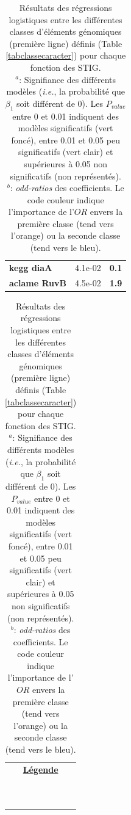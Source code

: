 \begin{landscape}
\begin{table}
{\begin{minipage}[t]{0.3\textwidth}
\begin{tabular}{>{\bfseries}p{\textwidth}cc}
\rowcolor{posit2}kegg diaA&4.1e-02&\textbf{\colorbox{colorpowernegxx}{0.1}}\\
\rowcolor{posit2}aclame RuvB&4.5e-02&\textbf{\colorbox{colorpower}{1.9}}\\
	\end{tabular}
	\begin{tabular}{@{\hspace{4cm}}>{\huge}c}
	\\[10cm]
	\textbf{\underline{Légende}}\\[0.8cm]
	\colorbox{colorpowerxxxx}{\makebox[5cm]{$e^{4}<OR$}}\\
	\colorbox{colorpowerxxx}{\makebox[5cm]{$e^{3}<OR<e^{4}$}}\\
	\colorbox{colorpowerxx}{\makebox[5cm]{$e^{2}<OR<e^{3}$}}\\
	\colorbox{colorpowerx}{\makebox[5cm]{$e^{1}<OR<e^{2}$}}\\
	\colorbox{colorpower}{\makebox[5cm]{$e^{0}<OR<e^{1}$}}\\
	\colorbox{colorpowerneg}{\makebox[5cm]{$e^{-1}<OR<e^{0}$}}\\
	\colorbox{colorpowernegx}{\makebox[5cm]{$e^{-2}<OR<e^{-1}$}}\\
	\colorbox{colorpowernegxx}{\makebox[5cm]{$e^{-3}<OR<e^{-2}$}}\\
	\colorbox{colorpowernegxxx}{\makebox[5cm]{$e^{-4}<OR<e^{-3}$}}\\
	\colorbox{colorpowernegxxxx}{\makebox[5cm]{$OR<e^{-4}$}}\\
	\end{tabular}
	\end{minipage}}
		\hspace*{-3cm}
	\begin{minipage}{2\textwidth}
	\hspace*{-3cm}
		\captionsetup{justification = raggedright}
	\caption[Résultats des régressions logistiques entre les différentes classes d'éléments génomiques]{ Résultats des régressions logistiques entre les différentes classes d'éléments génomiques (première ligne) définis (Table \ref{tabclassecaracter}) pour chaque fonction des STIG.\\
	\footnotesize\medskip $^{a}$: Signifiance des différents modèles (\textit{i.e.}, la probabilité que $\beta_{1}$ soit différent de 0). Les $P_{value}$ entre 0 et 0.01 indiquent des modèles significatifs (vert foncé), entre 0.01 et 0.05 peu significatifs (vert clair) et supérieures à 0.05 non significatifs (non représentés). \\ $^{b}$: \textit{odd-ratios} des coefficients. Le code couleur indique l'importance de l'$OR$ envers la première classe (tend vers l'orange) ou la seconde classe (tend vers le bleu).}\label{tabreglogis}
	\captionsetup{}
		\end{minipage}
\end{table}

\end{landscape}
			
